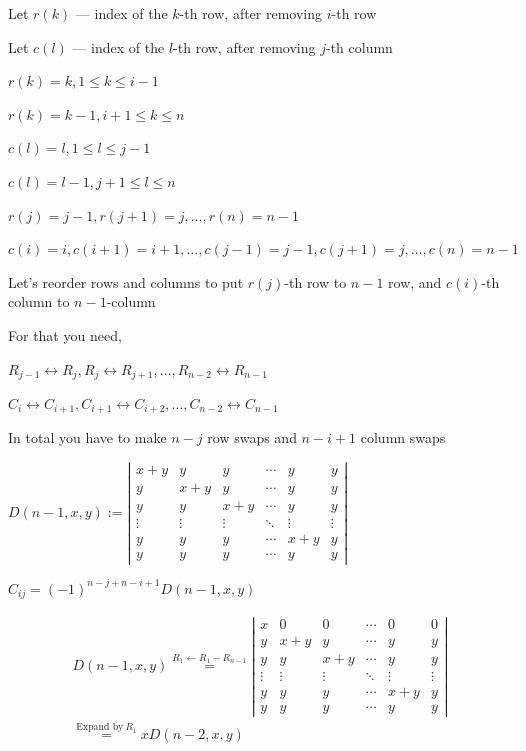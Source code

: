 \documentclass{article}
\begin{document}
Let \( r(k) \) --- index of the \( k \)-th row, after removing \( i \)-th row

Let \( c(l) \) --- index of the \( l \)-th row, after removing \( j \)-th column

\( r(k) = k, 1 \leq k \leq i - 1 \)

\( r(k) = k - 1, i + 1 \leq k \leq n \)

\( c(l) = l, 1 \leq l \leq j - 1 \)

\( c(l) = l - 1, j + 1 \leq l \leq n \)

\( r(j) = j - 1, r(j+1) = j, \ldots, r(n) = n - 1 \)

\( c(i) = i, c(i+1) = i + 1, \ldots, c(j-1) = j - 1, c(j+1) = j, \ldots, c(n) = n - 1 \)

Let's reorder rows and columns to put \( r(j) \)-th row to \( n-1 \) row, and \( c(i) \)-th column to \( n-1 \)-column

For that you need,

\( R_{j-1} \leftrightarrow R_{j}, R_{j} \leftrightarrow R_{j+1}, \ldots, R_{n-2} \leftrightarrow R_{n-1} \)

\( C_{i} \leftrightarrow C_{i+1}, C_{i+1} \leftrightarrow C_{i+2}, \ldots, C_{n-2} \leftrightarrow C_{n-1} \)

In total you have to make \( n-j \) row swaps and \( n-i+1 \) column swaps

\( D(n-1,x,y) := \left|\begin{matrix}x + y & y & y & \cdots & y & y \\ y & x + y & y & \cdots & y & y \\ y & y & x + y & \cdots & y & y \\ \vdots & \vdots & \vdots & \ddots & \vdots & \vdots \\ y & y & y & \cdots & x+y & y \\ y & y & y & \cdots & y & y \end{matrix}\right| \)

\( \hat{C}_{ij} = {(-1)}^{n-j+n-i+1} D(n-1, x, y) \)

\begin{multline*}
D(n-1,x,y) \overset{R_{1} \leftarrow R_{1} - R_{n-1}}{=} \left|\begin{matrix}x  & 0 & 0 & \cdots & 0 & 0 \\ y & x + y & y & \cdots & y & y \\ y & y & x + y & \cdots & y & y \\ \vdots & \vdots & \vdots & \ddots & \vdots & \vdots \\ y & y & y & \cdots & x+y & y \\ y & y & y & \cdots & y & y \end{matrix}\right| \\
\overset{\text{Expand by}\ R_{1}}{=} xD(n-2,x,y)
\end{multline*}
\end{document}
